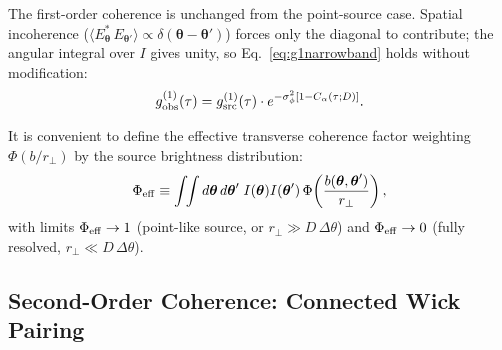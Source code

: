 \documentclass[aps,prd,onecolumn,amsmath,amssymb]{revtex4-2}
\begin{document}
The first-order coherence is unchanged from the point-source case.
Spatial incoherence ($\langle E^*_{\boldsymbol{\theta}}\,E_{\boldsymbol{\theta}'}\rangle
\propto \delta(\boldsymbol{\theta}-\boldsymbol{\theta}')$) forces only the
diagonal to contribute; the angular integral over $I$ gives unity, so
Eq.~\eqref{eq:g1narrowband} holds without modification:
\begin{equation}
  g^{(1)}_{\rm obs}(\tau)
  = g^{(1)}_{\rm src}(\tau)\cdot e^{-\sigma_\phi^2[1-C_\alpha(\tau;D)]}.
  \label{eq:g1ext}
\end{equation}

It is convenient to define the effective transverse coherence factor
weighting $\Phi(b/r_\perp)$ by the source brightness distribution:
\begin{equation}
  \Phi_{\rm eff}
  \equiv \int\!\!\int d\boldsymbol{\theta}\,d\boldsymbol{\theta}'\;
         I(\boldsymbol{\theta})I(\boldsymbol{\theta}')\,
         \Phi\!\left(\frac{b(\boldsymbol{\theta},\boldsymbol{\theta}')}{r_\perp}\right),
  \label{eq:PhiEff}
\end{equation}
with limits $\Phi_{\rm eff}\to 1$ (point-like source, or
$r_\perp\gg D\,\Delta\theta$) and $\Phi_{\rm eff}\to 0$ (fully resolved,
$r_\perp\ll D\,\Delta\theta$).

\subsection{Second-Order Coherence: Connected Wick Pairing}
\label{sec:g2ext}
\end{document}
